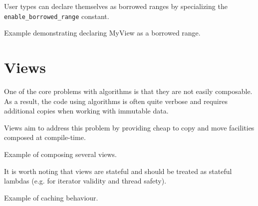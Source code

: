 User types can declare themselves as borrowed ranges by specializing the \texttt{enable\-\_borrowed\-\_range} constant.

\begin{codebox}[]{\href{https://compiler-explorer.com/z/Tnh687nxj}{\ExternalLink}}
\footnotesize Example demonstrating declaring MyView as a borrowed range.
\tcblower
{}
\end{codebox}

\section{Views}

One of the core problems with algorithms is that they are not easily composable. As a result, the code using algorithms is often quite verbose and requires additional copies when working with immutable data.

Views aim to address this problem by providing cheap to copy and move facilities composed at compile-time.

\begin{codebox}[]{\href{https://compiler-explorer.com/z/aM3vxs1f8}{\ExternalLink}}
\footnotesize Example of composing several views.
\tcblower
{}
\end{codebox}

It is worth noting that views are stateful and should be treated as stateful lambdas (e.g. for iterator validity and thread safety).

\begin{codebox}[]{\href{https://compiler-explorer.com/z/fK91qd3M4}{\ExternalLink}}
\footnotesize Example of  caching behaviour.
\tcblower
{}
\end{codebox}